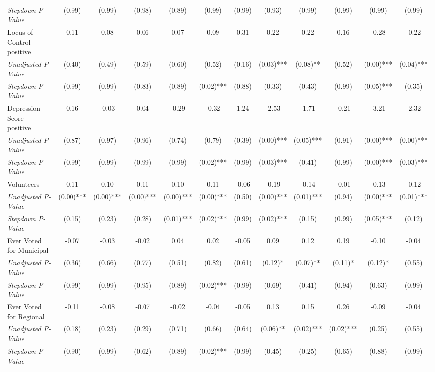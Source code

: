 \begin{tabular}{l c c c c c c c c c c c}
\quad \textit{Stepdown P-Value} & (0.99) & (0.99) & (0.98) & (0.89) & (0.99) & (0.99) & (0.93) & (0.99) & (0.99) & (0.99) & (0.99) \\
Locus of Control - positive & 0.11 & 0.08 & 0.06 & 0.07 & 0.09 & 0.31 & 0.22 & 0.22 & 0.16 & -0.28 & -0.22 \\
\quad \textit{Unadjusted P-Value} & (0.40) & (0.49) & (0.59) & (0.60) & (0.52) & (0.16) & (0.03)*** & (0.08)** & (0.52) & (0.00)*** & (0.04)*** \\
\quad \textit{Stepdown P-Value} & (0.99) & (0.99) & (0.83) & (0.89) & (0.02)*** & (0.88) & (0.33) & (0.43) & (0.99) & (0.05)*** & (0.35) \\
Depression Score - positive & 0.16 & -0.03 & 0.04 & -0.29 & -0.32 & 1.24 & -2.53 & -1.71 & -0.21 & -3.21 & -2.32 \\
\quad \textit{Unadjusted P-Value} & (0.87) & (0.97) & (0.96) & (0.74) & (0.79) & (0.39) & (0.00)*** & (0.05)*** & (0.91) & (0.00)*** & (0.00)*** \\
\quad \textit{Stepdown P-Value} & (0.99) & (0.99) & (0.99) & (0.99) & (0.02)*** & (0.99) & (0.03)*** & (0.41) & (0.99) & (0.00)*** & (0.03)*** \\
Volunteers & 0.11 & 0.10 & 0.11 & 0.10 & 0.11 & -0.06 & -0.19 & -0.14 & -0.01 & -0.13 & -0.12 \\
\quad \textit{Unadjusted P-Value} & (0.00)*** & (0.00)*** & (0.00)*** & (0.00)*** & (0.00)*** & (0.50) & (0.00)*** & (0.01)*** & (0.94) & (0.00)*** & (0.01)*** \\
\quad \textit{Stepdown P-Value} & (0.15) & (0.23) & (0.28) & (0.01)*** & (0.02)*** & (0.99) & (0.02)*** & (0.15) & (0.99) & (0.05)*** & (0.12) \\
Ever Voted for Municipal & -0.07 & -0.03 & -0.02 & 0.04 & 0.02 & -0.05 & 0.09 & 0.12 & 0.19 & -0.10 & -0.04 \\
\quad \textit{Unadjusted P-Value} & (0.36) & (0.66) & (0.77) & (0.51) & (0.82) & (0.61) & (0.12)* & (0.07)** & (0.11)* & (0.12)* & (0.55) \\
\quad \textit{Stepdown P-Value} & (0.99) & (0.99) & (0.95) & (0.89) & (0.02)*** & (0.99) & (0.69) & (0.41) & (0.94) & (0.63) & (0.99) \\
Ever Voted for Regional & -0.11 & -0.08 & -0.07 & -0.02 & -0.04 & -0.05 & 0.13 & 0.15 & 0.26 & -0.09 & -0.04 \\
\quad \textit{Unadjusted P-Value} & (0.18) & (0.23) & (0.29) & (0.71) & (0.66) & (0.64) & (0.06)** & (0.02)*** & (0.02)*** & (0.25) & (0.55) \\
\quad \textit{Stepdown P-Value} & (0.90) & (0.99) & (0.62) & (0.89) & (0.02)*** & (0.99) & (0.45) & (0.25) & (0.65) & (0.88) & (0.99) \\

\end{tabular}
